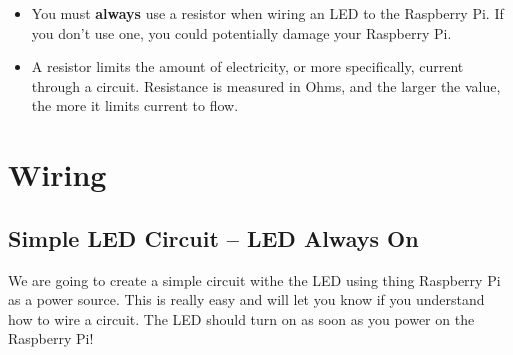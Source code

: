 \documentclass{article}\usepackage[]{graphicx}\usepackage[]{color}
\begin{document}
\begin{itemize}
\item You must \textbf{always} use a resistor when wiring an LED to the Raspberry Pi. If you don't use one, you could potentially damage your Raspberry Pi.
\item A resistor limits the amount of electricity, or more specifically, current through a circuit. Resistance is measured in Ohms, and the larger the value, the more it limits current to flow.

\end{itemize}

\section{Wiring}

\subsection{Simple LED Circuit -- LED Always On}

We are going to create a simple circuit withe the LED using thing Raspberry Pi as a power source. This is really easy and will let you know if you understand how to wire a circuit. The LED should turn on as soon as you power on the Raspberry Pi!
\end{document}

